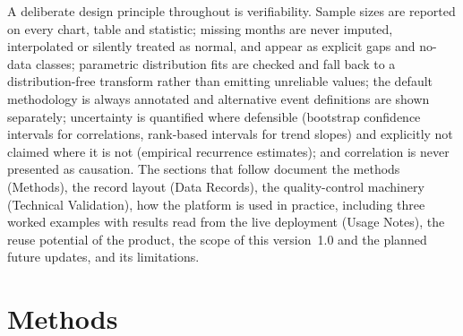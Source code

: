 \documentclass[10pt,a4paper]{article}
\begin{document}
A deliberate design principle throughout is verifiability. Sample sizes are reported on every chart, table and statistic; missing months are never imputed, interpolated or silently treated as normal, and appear as explicit gaps and no-data classes; parametric distribution fits are checked and fall back to a distribution-free transform rather than emitting unreliable values; the default methodology is always annotated and alternative event definitions are shown separately; uncertainty is quantified where defensible (bootstrap confidence intervals for correlations, rank-based intervals for trend slopes) and explicitly not claimed where it is not (empirical recurrence estimates); and correlation is never presented as causation. The sections that follow document the methods (Methods), the record layout (Data Records), the quality-control machinery (Technical Validation), how the platform is used in practice, including three worked examples with results read from the live deployment (Usage Notes), the reuse potential of the product, the scope of this version~1.0 and the planned future updates, and its limitations.

\section*{Methods}
\end{document}
